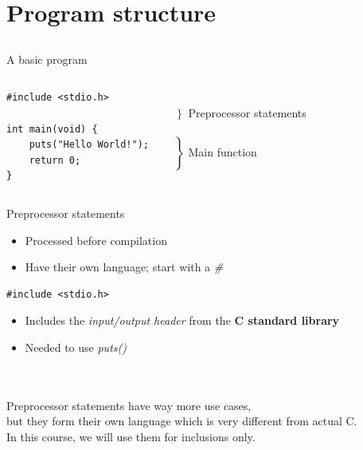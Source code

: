 \documentclass[10pt,graphics,aspectratio=169,table]{beamer}
\begin{document}
\section{Program structure}
\subsection{}
\begin{frame}[fragile]{A basic program}
	\begin{columns}[T]
		\begin{lstlisting}
#include <stdio.h>

int main(void) {
	puts("Hello World!");
	return 0;
}
\end{lstlisting}
		
		\ \\$\left. \begin{array}{c}\\\end{array}\right\rbrace $ Preprocessor statements
		\ \\\ \\$\left. \begin{array}{c}\\\\\\\\\\\end{array}\right\rbrace $ Main function
	\end{columns}
\end{frame}
\begin{frame}[fragile]{Preprocessor statements}
	\begin{itemize}
		\item Processed before compilation
		\item Have their own language; start with a \textit{\#}
	\end{itemize}
	\begin{lstlisting}
#include <stdio.h>
\end{lstlisting}
	\begin{itemize}
		\item Includes the \textit{input/output header} from the \textbf{C standard library}
		\item Needed to use \textit{puts()}
	\end{itemize}\ \\ \ \\
	Preprocessor statements have way more use cases,\\
	but they form their own language which is very different from actual C.\\
	\bigskip
	In this course, we will use them for inclusions only.
\end{frame}
\end{document}
